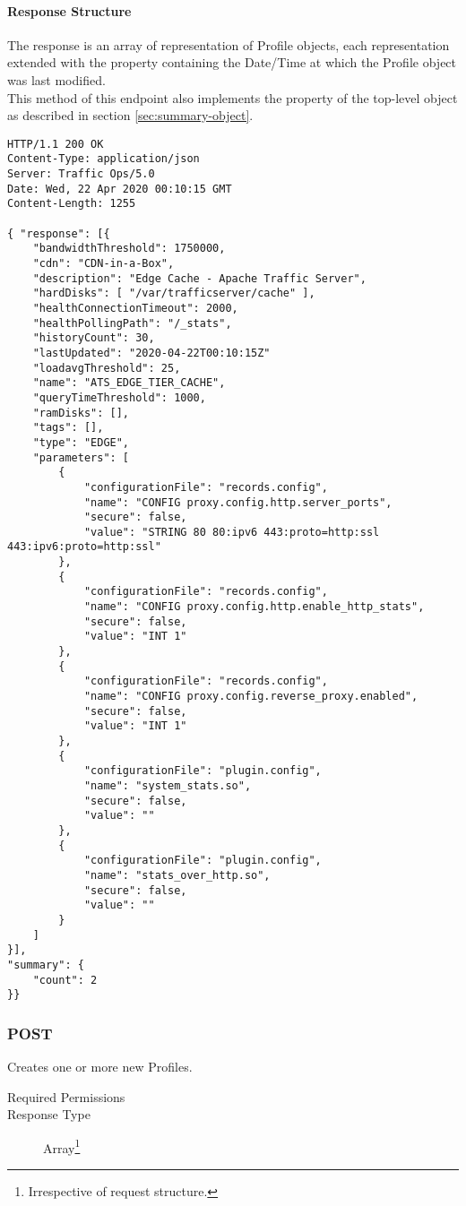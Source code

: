 \paragraph{Response Structure}
The response is an array of representation of Profile objects, each
representation extended with the  property containing the
Date/Time at which the Profile object was last modified.\\
This method of this endpoint also implements the  property of the
top-level  object as described in section
\ref{sec:summary-object}.\\

\begin{codelisting}
\begin{verbatim}
HTTP/1.1 200 OK
Content-Type: application/json
Server: Traffic Ops/5.0
Date: Wed, 22 Apr 2020 00:10:15 GMT
Content-Length: 1255

{ "response": [{
	"bandwidthThreshold": 1750000,
	"cdn": "CDN-in-a-Box",
	"description": "Edge Cache - Apache Traffic Server",
	"hardDisks": [ "/var/trafficserver/cache" ],
	"healthConnectionTimeout": 2000,
	"healthPollingPath": "/_stats",
	"historyCount": 30,
	"lastUpdated": "2020-04-22T00:10:15Z"
	"loadavgThreshold": 25,
	"name": "ATS_EDGE_TIER_CACHE",
	"queryTimeThreshold": 1000,
	"ramDisks": [],
	"tags": [],
	"type": "EDGE",
	"parameters": [
		{
			"configurationFile": "records.config",
			"name": "CONFIG proxy.config.http.server_ports",
			"secure": false,
			"value": "STRING 80 80:ipv6 443:proto=http:ssl 443:ipv6:proto=http:ssl"
		},
		{
			"configurationFile": "records.config",
			"name": "CONFIG proxy.config.http.enable_http_stats",
			"secure": false,
			"value": "INT 1"
		},
		{
			"configurationFile": "records.config",
			"name": "CONFIG proxy.config.reverse_proxy.enabled",
			"secure": false,
			"value": "INT 1"
		},
		{
			"configurationFile": "plugin.config",
			"name": "system_stats.so",
			"secure": false,
			"value": ""
		},
		{
			"configurationFile": "plugin.config",
			"name": "stats_over_http.so",
			"secure": false,
			"value": ""
		}
	]
}],
"summary": {
	"count": 2
}}
\end{verbatim}
\end{codelisting}

\subsubsection{POST}
Creates one or more new Profiles.
\begin{description}
	\item[Required Permissions] 
	\item[Response Type] Array\footnote{Irrespective of request structure.}
\end{description}

